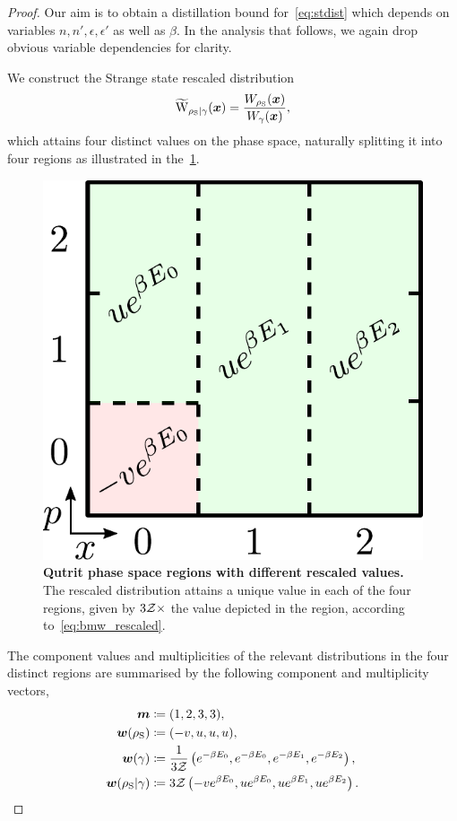\documentclass[pra,
aps,
twocolumn,
superscriptaddress,
groupedaddress,
nofootinbib,
reprint
]{revtex4-1}
\begin{document}
\begin{proof}
Our aim is to obtain a distillation bound for~\cref{eq:stdist} which depends on variables $n, n', \epsilon, \epsilon'$ as well as $\beta$.
In the analysis that follows, we again drop obvious variable dependencies for clarity.

We construct the Strange state rescaled distribution 
\begin{equation}
	\widetilde{\rm{W}}_{\rho_{\rm{S}}|\gamma}(\bmx) = \frac{\W[\bmx]{\rho_{\rm{S}}}}{\W[\bmx]{\gamma}},
\end{equation}
which attains four distinct values on the phase space, naturally splitting it into four regions as illustrated in the~\cref{fig:pd_split_thermal}.
\begin{figure}[h]
    \centering
    \includegraphics[scale=0.45]{figs/pd_split_thermal.pdf}
    \caption{\textbf{Qutrit phase space regions with different rescaled values.}
    The rescaled distribution attains a unique value in each of the four regions, given by $3\mathcal{Z} \times$ the value depicted in the region, according to~\cref{eq:bmw_rescaled}.
    }
    \label{fig:pd_split_thermal}
\end{figure}

The component values and multiplicities of the relevant distributions in the four distinct regions are summarised by the following component and multiplicity vectors,
\begin{align}
	\bm{m} &\coloneqq (1,2,3,3), \\
	\bm{w}(\rho_{\rm{S}}) &\coloneqq (-v, u, u, u), \\
	\bm{w}(\gamma) &\coloneqq \frac{1}{3\mathcal{Z}} \left( e^{-\beta E_0}, e^{-\beta E_0}, e^{-\beta E_1}, e^{-\beta E_2} \right), \\
	\bm{w}(\rho_{\rm{S}} | \gamma) &\coloneqq 3\mathcal{Z} \left( -v e^{\beta E_0}, u e^{\beta E_0}, u e^{\beta E_1}, u e^{\beta E_2} \right). \label{eq:bmw_rescaled}
\end{align}


\end{proof}
\end{document}
